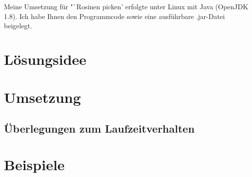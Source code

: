 \documentclass[a4paper, DIV=12]{scrreprt}
\newcommand{\task}[1]{Rosinen picken}
\begin{document}
	\titlehead{Teilnahme 6745 (Team 00001) \hfill Laurenz Grote}
	\title{\task}
	\subtitle{Aufgabe 1}
	\author{Laurenz Friedrich Grote}
	\date{}
	\maketitle
	\tableofcontents
	\vspace {2em}
	Meine Umsetzung für "`\task"' erfolgte unter Linux mit Java (OpenJDK 1.8). Ich habe Ihnen den Programmcode sowie eine ausführbare .jar-Datei beigelegt.
	\pagebreak
	\chapter{Lösungsidee}
		
	\chapter{Umsetzung}
		
		\section{Überlegungen zum Laufzeitverhalten}
			
	\chapter{Beispiele}
		
\end{document}
